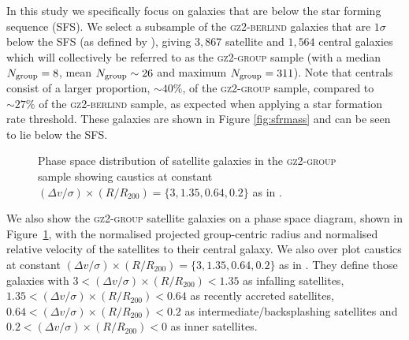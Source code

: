 \documentclass[useAMS,usenatbib]{mn2e}
\begin{document}
In this study we specifically focus on galaxies that are below the star forming sequence (SFS). We select a subsample of the \textsc{gz2-berlind} galaxies that are $1\sigma$ below the SFS (as defined by \citealt{peng10}), giving $3,867$ satellite and $1,564$ central galaxies which will collectively be referred to as the \textsc{gz2-group} sample (with a median $N_{\rm{group}}=8$, mean $N_{\rm{group}}\sim26$ and maximum $N_{\rm{group}}=311$). Note that centrals consist of a larger proportion, $\sim40\%$, of the \textsc{gz2-group} sample, compared to $\sim27\%$ of the \textsc{gz2-berlind} sample, as expected when applying a star formation rate threshold. These galaxies are shown in Figure \ref{fig:sfrmass} and can be seen to lie below the SFS.

\begin{figure}
\caption[]{Phase space distribution of satellite galaxies in the \textsc{gz2-group} sample showing caustics at constant $(\Delta v/\sigma)\times(R/R_{200}) = \{3, 1.35, 0.64, 0.2\}$ as in \cite{noble16}.}
\label{fig:phasespace}
\end{figure}

We also show the \textsc{gz2-group} satellite galaxies on a phase space diagram, shown in Figure~\ref{fig:phasespace}, with the normalised projected group-centric radius and normalised relative velocity of the satellites to their central galaxy. We also over plot caustics at constant $(\Delta v/\sigma)\times(R/R_{200}) = \{3, 1.35, 0.64, 0.2\}$ as in \cite{noble16}. They define those galaxies with $3<(\Delta v/\sigma)\times(R/R_{200})<1.35$ as infalling satellites, $1.35<(\Delta v/\sigma)\times(R/R_{200})<0.64$ as recently accreted satellites, $0.64<(\Delta v/\sigma)\times(R/R_{200})<0.2$ as intermediate/backsplashing satellites and $0.2<(\Delta v/\sigma)\times(R/R_{200})<0$ as inner satellites. 
\end{document}
